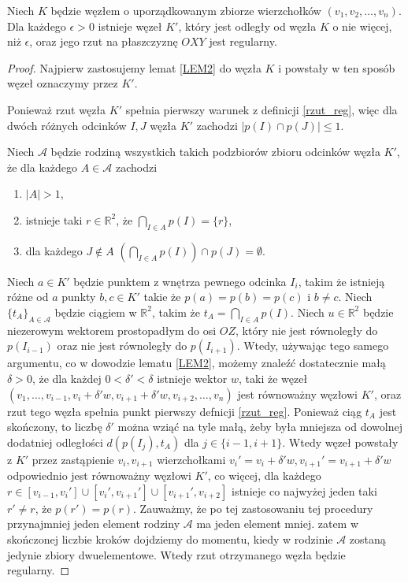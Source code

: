 \begin{twierdzenie}
 Niech $K$ będzie węzłem o uporządkowanym zbiorze wierzchołków $(v_1, v_2, \ldots, v_n)$. Dla każdego $\epsilon > 0$ istnieje węzeł $K'$, 
który jest odległy od węzła $K$ o nie więcej, niż $\epsilon$, oraz jego rzut na płaszczyznę $OXY$ jest regularny. 
\end{twierdzenie}
\begin{proof}

Najpierw zastosujemy lemat \ref{LEM2} do węzła $K$ i powstały w ten sposób węzeł oznaczymy przez $K'$.

Ponieważ rzut węzła $K'$ spełnia pierwszy warunek z definicji \ref{rzut_reg}, więc dla dwóch różnych odcinków $I,J$ węzła 
$K'$ zachodzi $|p(I)\cap p(J)| \le 1$.

Niech $\mathcal{A}$ będzie rodziną wszystkich takich podzbiorów zbioru odcinków węzła $K'$, że dla każdego $A\in\mathcal{A}$ zachodzi 
\begin{enumerate}
 \item $|A| > 1$,
 \item istnieje taki $r\in\mathbb{R}^2$, że $\bigcap_{I\in A}p(I) = \lbrace r\rbrace$,
 \item dla każdego $J\not\in A$ $\left(\bigcap_{I\in A}p(I)\right)\cap p(J) = \emptyset$.
\end{enumerate}

Niech $a\in K'$ będzie punktem z wnętrza pewnego odcinka $I_i$, takim że istnieją różne od $a$ punkty $b, c\in K'$ takie że $p(a) = p(b) = p(c)$ i $b\neq c$. 
Niech $\lbrace t_A\rbrace_{A\in\mathcal{A}}$ będzie ciągiem w $\mathbb{R}^2$, takim że $t_A = \bigcap_{I\in A}p(I)$. Niech $u\in\mathbb{R}^2$ będzie niezerowym wektorem prostopadłym do osi $OZ$, który
nie jest równoległy do $p(I_{i-1})$ oraz nie jest równoległy do $p(I_{i+1})$. Wtedy, używając tego samego argumentu, co w dowodzie lematu \ref{LEM2}, możemy znaleźć dostatecznie małą $\delta > 0$, że dla każdej $0 < \delta' < \delta$ istnieje wektor $w$, taki że
węzeł $(v_1, \ldots, v_{i-1}, v_i  + \delta'w, v_{i+1}  + \delta'w, v_{i+2}, \ldots, v_n)$ jest równoważny węzłowi $K'$, oraz rzut tego węzła spełnia punkt pierwszy 
defnicji \ref{rzut_reg}. Ponieważ ciąg $t_A$ jest skończony, to
liczbę $\delta'$ można wziąć na tyle małą, żeby była mniejsza od dowolnej dodatniej odległości $d(p(I_j), t_A)$ dla $j \in \lbrace i-1, i+1\rbrace$.
Wtedy węzeł powstały z $K'$ przez zastąpienie $v_i, v_{i+1}$ wierzchołkami $v_i'=v_{i} + \delta'w, v_{i+1}'=v_{i+1}+\delta'w$
odpowiednio jest równoważny węzłowi $K'$, co więcej, dla każdego $r\in[v_{i-1}, v_i']\cup[v_i', v_{i+1}']\cup[v_{i+1}', v_{i+2}]$ istnieje co najwyżej jeden taki $r'\neq r$, że $p(r') = p(r)$.
Zauważmy, że po tej zastosowaniu tej procedury przynajmniej jeden element rodziny $\mathcal{A}$ ma jeden element mniej.
zatem w skończonej liczbie kroków dojdziemy do momentu, kiedy w rodzinie $\mathcal{A}$ zostaną jedynie zbiory dwuelementowe. Wtedy rzut otrzymanego węzła będzie regularny. 

\end{proof}


